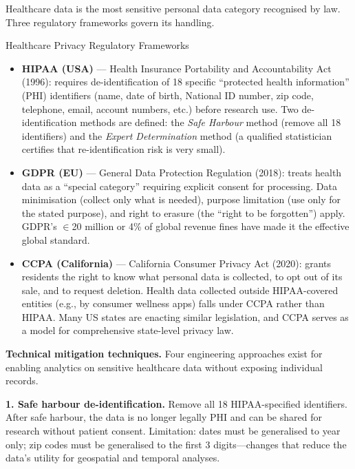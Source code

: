 Healthcare data is the most sensitive personal data category recognised
by law. Three regulatory frameworks govern its handling.

\begin{defbox}{Healthcare Privacy Regulatory Frameworks}
\begin{itemize}
  \item \textbf{HIPAA (USA)} — Health Insurance Portability and
        Accountability Act (1996): requires de-identification of 18
        specific ``protected health information'' (PHI) identifiers
        (name, date of birth, National ID number, zip code, telephone,
        email, account numbers, etc.) before research use. Two de-identification
        methods are defined: the \emph{Safe Harbour} method (remove all 18
        identifiers) and the \emph{Expert Determination} method (a qualified
        statistician certifies that re-identification risk is very small).
  \item \textbf{GDPR (EU)} — General Data Protection Regulation (2018):
        treats health data as a ``special category'' requiring explicit
        consent for processing. Data minimisation (collect only what is
        needed), purpose limitation (use only for the stated purpose), and
        right to erasure (the ``right to be forgotten'') apply. GDPR's
        $\in$20 million or 4\% of global revenue fines have made it the
        effective global standard.
  \item \textbf{CCPA (California)} — California Consumer Privacy Act
        (2020): grants residents the right to know what personal data is
        collected, to opt out of its sale, and to request deletion.
        Health data collected outside HIPAA-covered entities (e.g., by
        consumer wellness apps) falls under CCPA rather than HIPAA.
        Many US states are enacting similar legislation, and CCPA
        serves as a model for comprehensive state-level privacy law.
\end{itemize}
\end{defbox}

\textbf{Technical mitigation techniques.} Four engineering approaches
exist for enabling analytics on sensitive healthcare data without
exposing individual records.

\textbf{1. Safe harbour de-identification.} Remove all 18 HIPAA-specified
identifiers. After safe harbour, the data is no longer legally PHI and
can be shared for research without patient consent. Limitation: dates
must be generalised to year only; zip codes must be generalised to the
first 3 digits---changes that reduce the data's utility for geospatial
and temporal analyses.

